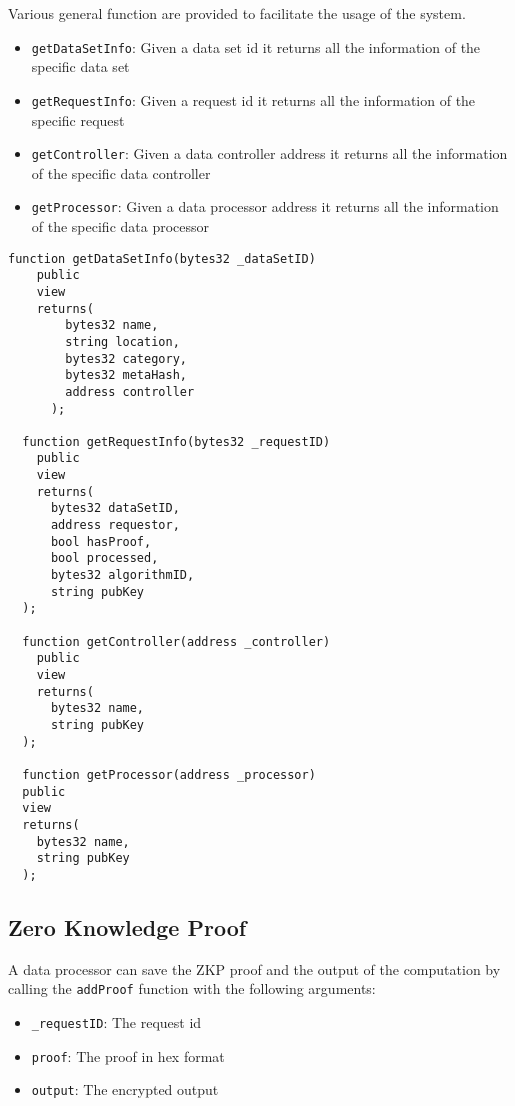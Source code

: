 Various general function are provided to facilitate the usage of the system.

\begin{itemize}
  \item \verb|getDataSetInfo|: Given a data set id it returns all the information of the specific data set
  \item \verb|getRequestInfo|: Given a request id it returns all the information of the specific request
  \item \verb|getController|: Given a data controller address it returns all the information of the specific data controller
  \item \verb|getProcessor|: Given a data processor address it returns all the information of the specific data processor
\end{itemize}

\begin{lstlisting}[language=Solidity, caption={General functions}]
  function getDataSetInfo(bytes32 _dataSetID)
    public
    view
    returns(
        bytes32 name,
        string location,
        bytes32 category,
        bytes32 metaHash,
        address controller
      );

  function getRequestInfo(bytes32 _requestID)
    public
    view
    returns(
      bytes32 dataSetID,
      address requestor,
      bool hasProof,
      bool processed,
      bytes32 algorithmID,
      string pubKey
  );

  function getController(address _controller)
    public
    view
    returns(
      bytes32 name,
      string pubKey
  );

  function getProcessor(address _processor)
  public
  view
  returns(
    bytes32 name,
    string pubKey
  );
\end{lstlisting}

\subsection{Zero Knowledge Proof}
\label{implemenation:contracts:zkp}

A data processor can save the ZKP proof and the output of the computation by calling the \verb|addProof| function with the following arguments:

\begin{itemize}
  \item \verb|_requestID|: The request id
  \item \verb|proof|: The proof in hex format
  \item \verb|output|: The encrypted output
\end{itemize}

